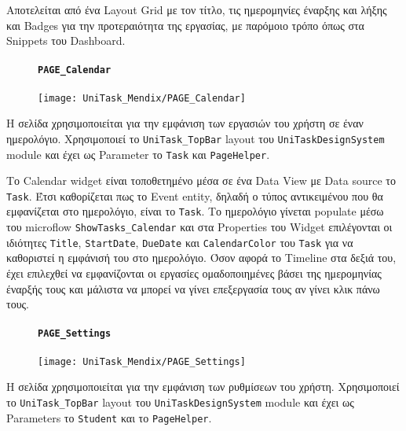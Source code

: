                 Αποτελείται από ένα Layout Grid με τον τίτλο, τις ημερομηνίες έναρξης και λήξης και Badges για την προτεραιότητα της εργασίας, με παρόμοιο τρόπο όπως στα Snippets του Dashboard.

                \begin{figure}[H] \noindent
                    \paragraph{\texttt{PAGE\_Calendar}}
                    \begin{center}
                        \texttt{[image: UniTask\_Mendix/PAGE\_Calendar]}
                    \end{center}
                \end{figure}

                Η σελίδα χρησιμοποιείται για την εμφάνιση των εργασιών του χρήστη σε έναν ημερολόγιο. Χρησιμοποιεί το \texttt{UniTask\_TopBar} layout του \texttt{UniTaskDesignSystem} module και έχει ως Parameter το \texttt{Task} και \texttt{PageHelper}.

                Το Calendar widget είναι τοποθετημένο μέσα σε ένα Data View με Data source το \texttt{Task}. Έτσι καθορίζεται πως το Event entity, δηλαδή ο τύπος αντικειμένου που θα εμφανίζεται στο ημερολόγιο, είναι το \texttt{Task}. Το ημερολόγιο γίνεται populate μέσω του microflow \texttt{ShowTasks\_Calendar} και στα Properties του Widget επιλέγονται οι ιδιότητες \texttt{Title}, \texttt{StartDate}, \texttt{DueDate} και \texttt{CalendarColor} του \texttt{Task} για να καθοριστεί η εμφάνισή του στο ημερολόγιο. Όσον αφορά το Timeline στα δεξιά του, έχει επιλεχθεί να εμφανίζονται οι εργασίες ομαδοποιημένες βάσει της ημερομηνίας έναρξής τους και μάλιστα να μπορεί να γίνει επεξεργασία τους αν γίνει κλικ πάνω τους.

                \begin{figure}[H] \noindent
                    \paragraph{\texttt{PAGE\_Settings}}
                    \begin{center}
                        \texttt{[image: UniTask\_Mendix/PAGE\_Settings]}
                    \end{center}
                \end{figure}

                Η σελίδα χρησιμοποιείται για την εμφάνιση των ρυθμίσεων του χρήστη. Χρησιμοποιεί το \texttt{UniTask\_TopBar} layout του \texttt{UniTaskDesignSystem} module και έχει ως Parameters το \texttt{Student} και το \texttt{PageHelper}.

